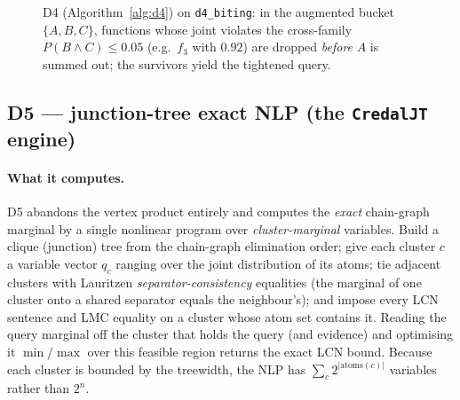 \documentclass[11pt]{article}
\begin{document}
\begin{figure}[t]
\centering
{}
\caption{D4 (Algorithm~\ref{alg:d4}) on \texttt{d4\_biting}: in the augmented bucket
  $\{A,B,C\}$, functions whose joint violates the cross-family $P(B\land C)\le0.05$ (e.g.\
  $f_3$ with $0.92$) are dropped \emph{before} $A$ is summed out; the survivors yield the
  tightened query.}
\label{fig:d4}
\end{figure}

\subsection{D5 --- junction-tree exact NLP (the \texttt{CredalJT} engine)}
\label{sec:d5-detail}

\paragraph{What it computes.} D5 abandons the vertex product entirely and computes the
\emph{exact} chain-graph marginal by a single nonlinear program over \emph{cluster-marginal}
variables. Build a clique (junction) tree from the chain-graph elimination order; give each
cluster $c$ a variable vector $q_c$ ranging over the joint distribution of its atoms; tie
adjacent clusters with Lauritzen \emph{separator-consistency} equalities (the marginal of one
cluster onto a shared separator equals the neighbour's); and impose every LCN sentence and
LMC equality on a cluster whose atom set contains it. Reading the query marginal off the
cluster that holds the query (and evidence) and optimising it $\min/\max$ over this feasible
region returns the exact LCN bound. Because each cluster is bounded by the treewidth, the NLP
has $\sum_c 2^{|\mathrm{atoms}(c)|}$ variables rather than $2^n$.
\end{document}
